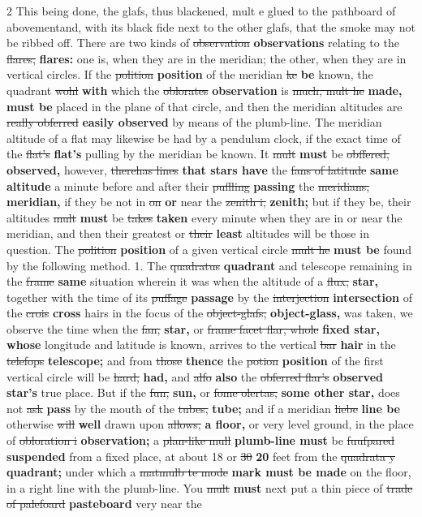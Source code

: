 \documentclass[10pt]{article}
\begin{document}
\begin{multicols}{2}
This being done, the glafs, thus blackened, mult e glued to the pathboard of abovementand, with its black fide next to the other glafs, that the smoke may not be ribbed off. There are two kinds of \sout{observation} \textbf{observations} relating to the \sout{flares,} \textbf{flares:} one is, when they are in the meridian; the other, when they are in vertical circles. If the \sout{polition} \textbf{position} of the meridian \sout{ke} \textbf{be} known, the quadrant \sout{wohl} \textbf{with} which the \sout{oblorates} \textbf{observation} is \sout{much, mult he} \textbf{made, must be} placed in the plane of that circle, and then the meridian altitudes are \sout{really obferred} \textbf{easily observed} by means of the plumb-line. The meridian altitude of a flat may likewise be had by a pendulum clock, if the exact time of the \sout{flat’s} \textbf{flat's} pulling by the meridian be known. It \sout{mult} \textbf{must} be \sout{obffered,} \textbf{observed,} however, \sout{therehas lines} \textbf{that stars have} the \sout{fans of latitude} \textbf{same altitude} a minute before and after their \sout{puffling} \textbf{passing} the \sout{meridians,} \textbf{meridian,} if they be not in \sout{on} \textbf{or} near the \sout{zenith i,} \textbf{zenith;} but if they be, their altitudes \sout{mult} \textbf{must} be \sout{takes} \textbf{taken} every minute when they are in or near the meridian, and then their greatest or \sout{their} \textbf{least} altitudes will be those in question. The \sout{polition} \textbf{position} of a given vertical circle \sout{mult he} \textbf{must be} found by the following method. 1. The \sout{quadratus} \textbf{quadrant} and telescope remaining in the \sout{frame} \textbf{same} situation wherein it was when the altitude of a \sout{flux,} \textbf{star,} together with the time of its \sout{puffage} \textbf{passage} by the \sout{interjection} \textbf{intersection} of the \sout{crois} \textbf{cross} hairs in the focus of the \sout{object-glafs,} \textbf{object-glass,} was taken, we observe the time when the \sout{fan,} \textbf{star,} or \sout{frame facet flar, whole} \textbf{fixed star, whose} longitude and latitude is known, arrives to the vertical \sout{bar} \textbf{hair} in the \sout{telefops} \textbf{telescope;} and from \sout{those} \textbf{thence} the \sout{potion} \textbf{position} of the first vertical circle will be \sout{hard,} \textbf{had,} and \sout{alfo} \textbf{also} the \sout{obferred flar's} \textbf{observed star's} true place. But if the \sout{fun,} \textbf{sun,} or \sout{fome olertas,} \textbf{some other star,} does not \sout{ask} \textbf{pass} by the mouth of the \sout{tubes,} \textbf{tube;} and if a meridian \sout{liebe} \textbf{line be} otherwise \sout{will} \textbf{well} drawn upon \sout{allows,} \textbf{a floor,} or very level ground, in the place of \sout{obloration i} \textbf{observation;} a \sout{plan-like mull} \textbf{plumb-line must} be \sout{fuufpared} \textbf{suspended} from a fixed place, at about 18 or \sout{30} \textbf{20} feet from the \sout{quadrata y} \textbf{quadrant;} under which a \sout{matmulb te mode} \textbf{mark must be made} on the floor, in a right line with the plumb-line. You \sout{mult} \textbf{must} next put a thin piece of \sout{trade of palefoard} \textbf{pasteboard} very near the 
\end{multicols}
\end{document}
